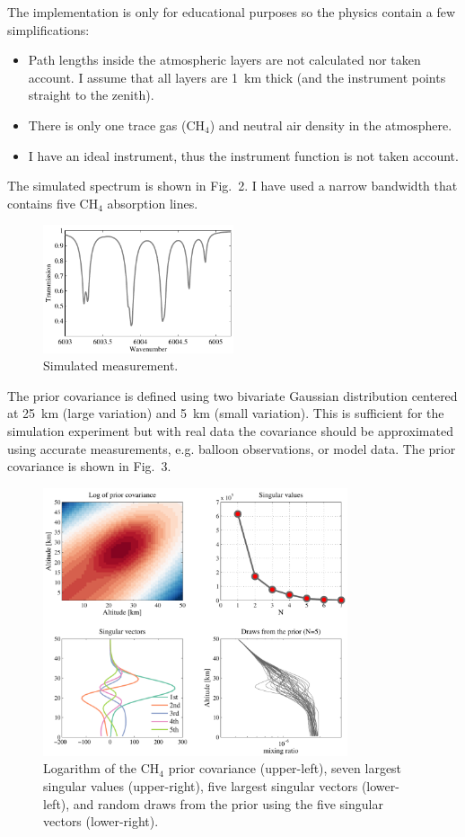 \documentclass[12pt,a4paper]{article}
\begin{document}
The implementation is only for educational purposes so the physics contain a few simplifications:
\begin{itemize}
  \item Path lengths inside the atmospheric layers are not calculated nor taken account. I assume that all layers are 1~km thick (and the instrument points straight to the zenith). 
  \item There is only one trace gas (CH$_4$) and neutral air density in the atmosphere.
  \item I have an ideal instrument, thus the instrument function is not taken account.
\end{itemize}
The simulated spectrum is shown in Fig.~2. I have used a narrow bandwidth that contains five CH$_4$ absorption lines.
\begin{figure}[h]
  \label{fig:simuspec}
  \centering
  \includegraphics[width=0.5\textwidth]{figs/simu_spectrum.pdf}
  \caption{Simulated measurement.}
\end{figure}


The prior covariance is defined using two bivariate Gaussian distribution centered at 25~km (large variation) and 5~km (small variation).
This is sufficient for the simulation experiment but with real data the covariance should be approximated using accurate measurements, e.g. balloon observations, or model data.
The prior covariance is shown in Fig.~3.
\begin{figure}[h]
  \centering
  \includegraphics[width=0.8\textwidth]{figs/special_covariance.pdf}  
  \caption{Logarithm of the CH$_4$ prior covariance (upper-left), seven largest singular values (upper-right),
    five largest singular vectors (lower-left),
    and random draws from the prior using the five singular vectors (lower-right).}
  \label{cov}
\end{figure}
\end{document}
